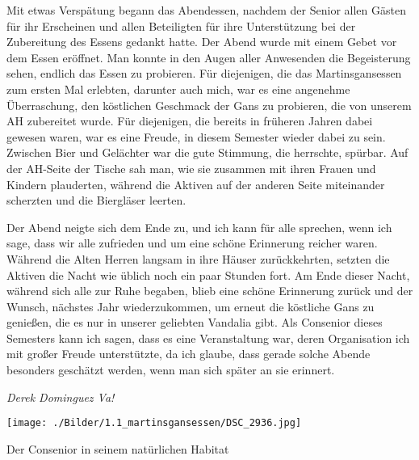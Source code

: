 \begin{multicols}{2}
Mit etwas Verspätung begann das Abendessen, nachdem der Senior allen Gästen für ihr Erscheinen und allen Beteiligten für ihre Unterstützung bei der Zubereitung des Essens gedankt hatte. Der Abend wurde mit einem Gebet vor dem Essen eröffnet. Man konnte in den Augen aller Anwesenden die Begeisterung sehen, endlich das Essen zu probieren. Für diejenigen, die das Martinsgansessen zum ersten Mal erlebten, darunter auch mich, war es eine angenehme Überraschung, den köstlichen Geschmack der Gans zu probieren, die von unserem AH zubereitet wurde. Für diejenigen, die bereits in früheren Jahren dabei gewesen waren, war es eine Freude, in diesem Semester wieder dabei zu sein. Zwischen Bier und Gelächter war die gute Stimmung, die herrschte, spürbar. Auf der AH-Seite der Tische sah man, wie sie zusammen mit ihren Frauen und Kindern plauderten, während die Aktiven auf der anderen Seite miteinander scherzten und die Biergläser leerten.

Der Abend neigte sich dem Ende zu, und ich kann für alle sprechen, wenn ich sage, dass wir alle zufrieden und um eine schöne Erinnerung reicher waren. Während die Alten Herren langsam in ihre Häuser zurückkehrten, setzten die Aktiven die Nacht wie üblich noch ein paar Stunden fort. Am Ende dieser Nacht, während sich alle zur Ruhe begaben, blieb eine schöne Erinnerung zurück und der Wunsch, nächstes Jahr wiederzukommen, um erneut die köstliche Gans zu genießen, die es nur in unserer geliebten Vandalia gibt. Als Consenior dieses Semesters kann ich sagen, dass es eine Veranstaltung war, deren Organisation ich mit großer Freude unterstützte, da ich glaube, dass gerade solche Abende besonders geschätzt werden, wenn man sich später an sie erinnert.
	
	\begin{flushright}
		\hfill\emph{Derek Dominguez Va!}
	\end{flushright}
\end{multicols}
%

%
\begin{figurehere}
	\begin{center}
		\texttt{[image: ./Bilder/1.1\_martinsgansessen/DSC\_2936.jpg]}
		\caption{Der Consenior in seinem natürlichen Habitat} 
	\end{center}
\end{figurehere}
	

%
